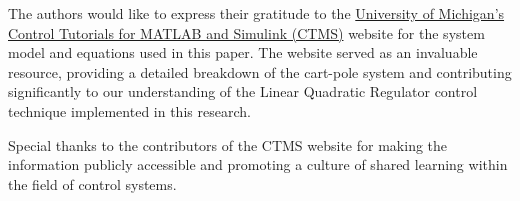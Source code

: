 \documentclass[11pt,twocolumn,twoside,lineno]{pnas-new}
\begin{document}
The authors would like to express their gratitude to the \href{https://ctms.engin.umich.edu/CTMS/index.php?example=InvertedPendulum&section=SystemModeling}{University of Michigan's Control Tutorials for MATLAB and Simulink (CTMS)} website for the system model and equations used in this paper. The website served as an invaluable resource, providing a detailed breakdown of the cart-pole system and contributing significantly to our understanding of the Linear Quadratic Regulator control technique implemented in this research.

Special thanks to the contributors of the CTMS website for making the information publicly accessible and promoting a culture of shared learning within the field of control systems.


\showacknow{} %


\end{document}
